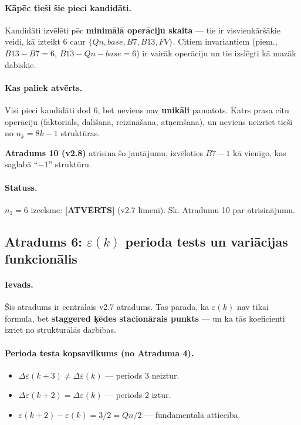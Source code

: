 \documentclass[12pt,a4paper]{article}
\begin{document}
\paragraph{Kāpēc tieši šie pieci kandidāti.}
Kandidāti izvēlēti pēc \textbf{minimālā operāciju skaita} — tie ir visvienkāršākie veidi, kā izteikt 6 caur $\{Qn, base, B7, B13, FV\}$. Citiem invariantiem (piem., $B13 - B7 = 6$, $B13 - Qn - base = 6$) ir vairāk operāciju un tie izslēgti kā mazāk dabiskie.

\paragraph{Kas paliek atvērts.}
Visi pieci kandidāti dod 6, bet neviens nav \textbf{unikāli} pamatots. Katrs prasa citu operāciju (faktoriāls, dalīšana, reizināšana, atņemšana), un neviens neizriet tieši no $n_k = 8k-1$ struktūras.

\textbf{Atradums 10 (v2.8)} atrisina šo jautājumu, izvēloties $B7 - 1$ kā vienīgo, kas saglabā ``$-1$'' struktūru.

\paragraph{Statuss.}
$n_1 = 6$ izcelsme: \textbf{[ATVĒRTS]} (v2.7 līmenī). Sk. Atradumu 10 par atrisinājumu.

\subsection*{Atradums 6: $\varepsilon(k)$ perioda tests un variācijas funkcionālis}

\paragraph{Ievads.}
Šis atradums ir centrālais v2.7 atradums. Tas parāda, ka $\varepsilon(k)$ nav tikai formula, bet \textbf{staggered ķēdes stacionārais punkts} — un ka tās koeficienti izriet no strukturālās darbības.

\paragraph{Perioda testa kopsavilkums (no Atraduma 4).}
\begin{itemize}
    \item $\Delta\varepsilon(k+3) \neq \Delta\varepsilon(k)$ — periods 3 neiztur.
    \item $\Delta\varepsilon(k+2) = \Delta\varepsilon(k)$ — periods 2 iztur.
    \item $\varepsilon(k+2) - \varepsilon(k) = 3/2 = Qn/2$ — fundamentālā attiecība.
\end{itemize}
\end{document}
